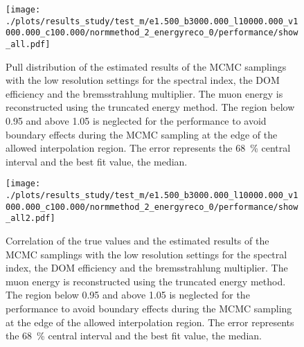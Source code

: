 %

\begin{figure}
    \centering
    \texttt{[image: ./plots/results\_study/test\_m/e1.500\_b3000.000\_l10000.000\_v1000.000\_c100.000/normmethod\_2\_energyreco\_0/performance/show\_all.pdf]}
    \caption{Pull distribution of the estimated results of the MCMC samplings with the low resolution settings for the spectral index, the DOM efficiency and the bremsstrahlung multiplier. The muon energy is reconstructed using the truncated energy method. The region below 0.95 and above 1.05 is neglected for the performance to avoid boundary effects during the MCMC sampling at the edge of the allowed interpolation region. The error represents the \SI{68}{\%} central interval and the best fit value, the median.}
    \label{fig:study_result_pull_low_te}
\end{figure}

\begin{figure}
    \centering
    \texttt{[image: ./plots/results\_study/test\_m/e1.500\_b3000.000\_l10000.000\_v1000.000\_c100.000/normmethod\_2\_energyreco\_0/performance/show\_all2.pdf]}
    \caption{Correlation of the true values and the estimated results of the MCMC samplings with the low resolution settings for the spectral index, the DOM efficiency and the bremsstrahlung multiplier. The muon energy is reconstructed using the truncated energy method. The region below 0.95 and above 1.05 is neglected for the performance to avoid boundary effects during the MCMC sampling at the edge of the allowed interpolation region. The error represents the \SI{68}{\%} central interval and the best fit value, the median.}
    \label{fig:study_result_corr_low_te}
\end{figure}






